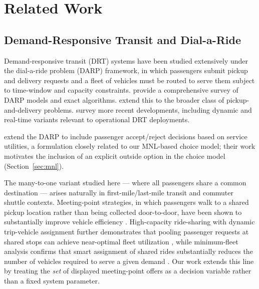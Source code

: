 \section{Related Work}

\subsection{Demand-Responsive Transit and Dial-a-Ride}

Demand-responsive transit (DRT) systems have been studied extensively under the dial-a-ride problem (DARP) framework, in which passengers submit pickup and delivery requests and a fleet of vehicles must be routed to serve them subject to time-window and capacity constraints. \citet{cordeau2007dial} provide a comprehensive survey of DARP models and exact algorithms. \citet{parragh2008survey} extend this to the broader class of pickup-and-delivery problems. \citet{ho2018survey} survey more recent developments, including dynamic and real-time variants relevant to operational DRT deployments.

\citet{dong2020} extend the DARP to include passenger accept/reject decisions based on service utilities, a formulation closely related to our MNL-based choice model; their work motivates the inclusion of an explicit outside option in the choice model (Section~\ref{sec:mnl}).

The many-to-one variant studied here --- where all passengers share a common destination --- arises naturally in first-mile/last-mile transit and commuter shuttle contexts. Meeting-point strategies, in which passengers walk to a shared pickup location rather than being collected door-to-door, have been shown to substantially improve vehicle efficiency \citep{stiglic2015benefits}. High-capacity ride-sharing with dynamic trip-vehicle assignment further demonstrates that pooling passenger requests at shared stops can achieve near-optimal fleet utilization \citep{alonso2017demand}, while minimum-fleet analysis confirms that smart assignment of shared rides substantially reduces the number of vehicles required to serve a given demand \citep{vazifeh2018addressing}. Our work extends this line by treating the \emph{set} of displayed meeting-point offers as a decision variable rather than a fixed system parameter.


